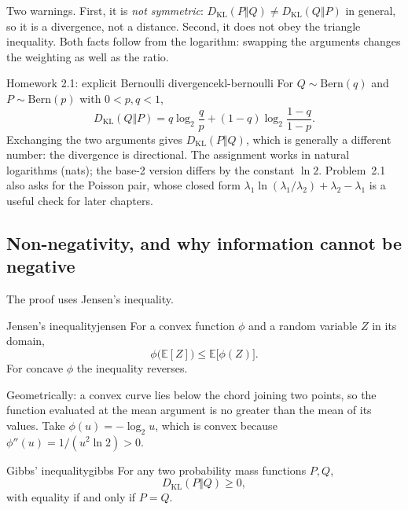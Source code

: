 Two warnings. First, it is \emph{not symmetric}: $D_{\mathrm{KL}}(P\Vert Q)\neq D_{\mathrm{KL}}(Q\Vert P)$ in general, so it is a divergence, not a distance. Second, it does not obey the triangle inequality. Both facts follow from the logarithm: swapping the arguments changes the weighting as well as the ratio.

\begin{example}[unbreakable,fontupper=\small]{Homework 2.1: explicit Bernoulli divergence}{kl-bernoulli}
For $Q\sim\mathrm{Bern}(q)$ and $P\sim\mathrm{Bern}(p)$ with $0<p,q<1$,
\begin{equation}\label{eq:lec02:kl-bernoulli}
D_{\mathrm{KL}}(Q\Vert P)=q\log_2\frac{q}{p}+(1-q)\log_2\frac{1-q}{1-p}.
\end{equation}
Exchanging the two arguments gives $D_{\mathrm{KL}}(P\Vert Q)$, which is generally a different number: the divergence is directional. The assignment works in natural logarithms (nats); the base-2 version differs by the constant $\ln2$. Problem~2.1 also asks for the Poisson pair, whose closed form $\lambda_1\ln(\lambda_1/\lambda_2)+\lambda_2-\lambda_1$ is a useful check for later chapters.
\end{example}

\subsection{Non-negativity, and why information cannot be negative}\label{subsec:lec02:gibbs}
The proof uses Jensen's inequality.

\begin{proposition}[unbreakable]{Jensen's inequality}{jensen}
For a convex function $\phi$ and a random variable $Z$ in its domain,
\begin{equation}\label{eq:lec02:jensen}
\phi\bigl(\mathbb E[Z]\bigr)\leq\mathbb E\bigl[\phi(Z)\bigr].
\end{equation}
For concave $\phi$ the inequality reverses.
\end{proposition}

Geometrically: a convex curve lies below the chord joining two points, so the function evaluated at the mean argument is no greater than the mean of its values. Take $\phi(u)=-\log_2u$, which is convex because $\phi''(u)=1/(u^2\ln2)>0$.

\begin{proposition}[unbreakable]{Gibbs' inequality}{gibbs}
For any two probability mass functions $P,Q$,
\begin{equation}\label{eq:lec02:gibbs}
D_{\mathrm{KL}}(P\Vert Q)\geq0,
\end{equation}
with equality if and only if $P=Q$.
\end{proposition}

